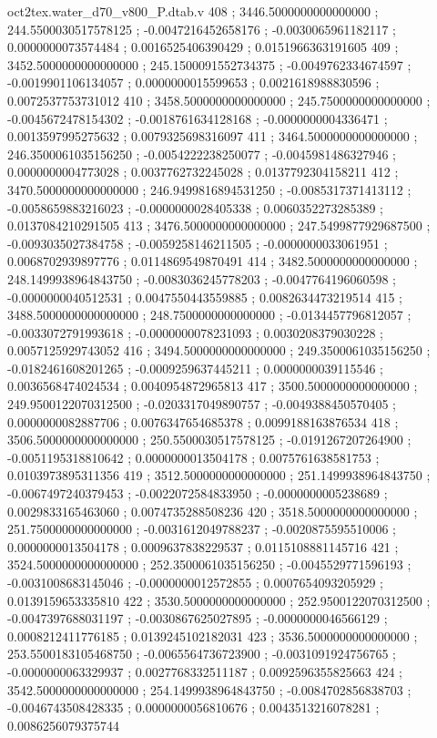 \begin{filecontents}[overwrite]{oct2tex.water_d70_v800_P.dtab.v}
408 ; 3446.5000000000000000 ; 244.5500030517578125 ; -0.0047216452658176 ; -0.0030065961182117 ; 0.0000000073574484 ; 0.0016525406390429 ; 0.0151966363191605
409 ; 3452.5000000000000000 ; 245.1500091552734375 ; -0.0049762334674597 ; -0.0019901106134057 ; 0.0000000015599653 ; 0.0021618988830596 ; 0.0072537753731012
410 ; 3458.5000000000000000 ; 245.7500000000000000 ; -0.0045672478154302 ; -0.0018761634128168 ; -0.0000000004336471 ; 0.0013597995275632 ; 0.0079325698316097
411 ; 3464.5000000000000000 ; 246.3500061035156250 ; -0.0054222238250077 ; -0.0045981486327946 ; 0.0000000004773028 ; 0.0037762732245028 ; 0.0137792304158211
412 ; 3470.5000000000000000 ; 246.9499816894531250 ; -0.0085317371413112 ; -0.0058659883216023 ; -0.0000000028405338 ; 0.0060352273285389 ; 0.0137084210291505
413 ; 3476.5000000000000000 ; 247.5499877929687500 ; -0.0093035027384758 ; -0.0059258146211505 ; -0.0000000033061951 ; 0.0068702939897776 ; 0.0114869549870491
414 ; 3482.5000000000000000 ; 248.1499938964843750 ; -0.0083036245778203 ; -0.0047764196060598 ; -0.0000000040512531 ; 0.0047550443559885 ; 0.0082634473219514
415 ; 3488.5000000000000000 ; 248.7500000000000000 ; -0.0134457796812057 ; -0.0033072791993618 ; -0.0000000078231093 ; 0.0030208379030228 ; 0.0057125929743052
416 ; 3494.5000000000000000 ; 249.3500061035156250 ; -0.0182461608201265 ; -0.0009259637445211 ; 0.0000000039115546 ; 0.0036568474024534 ; 0.0040954872965813
417 ; 3500.5000000000000000 ; 249.9500122070312500 ; -0.0203317049890757 ; -0.0049388450570405 ; 0.0000000082887706 ; 0.0076347654685378 ; 0.0099188163876534
418 ; 3506.5000000000000000 ; 250.5500030517578125 ; -0.0191267207264900 ; -0.0051195318810642 ; 0.0000000013504178 ; 0.0075761638581753 ; 0.0103973895311356
419 ; 3512.5000000000000000 ; 251.1499938964843750 ; -0.0067497240379453 ; -0.0022072584833950 ; -0.0000000005238689 ; 0.0029833165463060 ; 0.0074735288508236
420 ; 3518.5000000000000000 ; 251.7500000000000000 ; -0.0031612049788237 ; -0.0020875595510006 ; 0.0000000013504178 ; 0.0009637838229537 ; 0.0115108881145716
421 ; 3524.5000000000000000 ; 252.3500061035156250 ; -0.0045529771596193 ; -0.0031008683145046 ; -0.0000000012572855 ; 0.0007654093205929 ; 0.0139159653335810
422 ; 3530.5000000000000000 ; 252.9500122070312500 ; -0.0047397688031197 ; -0.0030867625027895 ; -0.0000000046566129 ; 0.0008212411776185 ; 0.0139245102182031
423 ; 3536.5000000000000000 ; 253.5500183105468750 ; -0.0065564736723900 ; -0.0031091924756765 ; -0.0000000063329937 ; 0.0027768332511187 ; 0.0092596355825663
424 ; 3542.5000000000000000 ; 254.1499938964843750 ; -0.0084702856838703 ; -0.0046743508428335 ; 0.0000000056810676 ; 0.0043513216078281 ; 0.0086256079375744

\end{filecontents}
